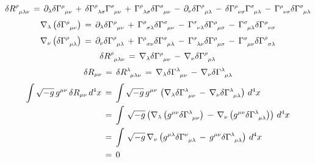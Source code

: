 \begin{equation}
    \delta\R[\rho]{\mu}[\lambda]{\nu} \,=\, \partial\subscr{\lambda}\delta\Gamma\superscr{\rho}\subscr{\;\;\mu\nu} \,+\, \delta\Gamma\superscr{\rho}\subscr{\;\;\lambda\sigma}\Gamma\superscr{\sigma}\subscr{\;\;\mu\nu} \,+\, \Gamma\superscr{\rho}\subscr{\;\;\lambda\sigma}\delta\Gamma\superscr{\sigma}\subscr{\;\;\mu\nu} \,-\, \partial\subscr{\nu}\delta\Gamma\superscr{\rho}\subscr{\;\;\mu\lambda} \,-\, \delta\Gamma\superscr{\rho}\subscr{\;\;\nu\sigma}\Gamma\superscr{\sigma}\subscr{\;\;\mu\lambda} \,-\, \Gamma\superscr{\rho}\subscr{\;\;\nu\sigma}\delta\Gamma\superscr{\sigma}\subscr{\;\;\mu\lambda}
\end{equation}
\begin{equation}
    \nabla\subscr{\lambda}\left(\delta\con{\rho}{\mu}{\nu}\right) \,=\, \partial\subscr{\lambda}\delta\Gamma\superscr{\rho}\subscr{\;\;\mu\nu} \,+\, \Gamma\superscr{\rho}\subscr{\;\;\sigma\lambda}\delta\Gamma\superscr{\sigma}\subscr{\;\;\mu\nu} \,-\, \Gamma\superscr{\sigma}\subscr{\;\;\nu\lambda}\delta\Gamma\superscr{\rho}\subscr{\;\;\mu\sigma} \,-\, \con{\sigma}{\mu}{\lambda}\delta\con{\rho}{\nu}{\sigma}
\end{equation}
\begin{equation}
    \nabla\subscr{\nu}\left(\delta\con{\rho}{\mu}{\lambda}\right) \,=\, \partial\subscr{\nu}\delta\con{\rho}{\mu}{\lambda} \,+\, \con{\rho}{\sigma}{\nu}\delta\con{\sigma}{\mu}{\lambda} \,-\, \con{\sigma}{\lambda}{\nu}\delta\con{\rho}{\mu}{\sigma} \,-\, \con{\sigma}{\mu}{\nu}\delta\con{\rho}{\sigma}{\lambda}
\end{equation}
\begin{equation}
    \delta\R[\rho]{\mu}[\lambda]{\nu} \,=\, \nabla\subscr{\lambda}\delta\con{\rho}{\mu}{\nu} \,-\, \nabla\subscr{\nu}\delta\con{\rho}{\mu}{\lambda}
\end{equation}
\begin{equation}
    \delta\R{\mu}{\nu} \,=\, \delta\R[\lambda]{\mu}[\lambda]{\nu} \,=\, \nabla\subscr{\lambda}\delta\con{\lambda}{\mu}{\nu} \,-\, \nabla\subscr{\nu}\delta\con{\lambda}{\mu}{\lambda}
\end{equation}
\begin{equation}
\begin{split}
    \int \sqrt{-g} \,\g[i]{\mu}{\nu}\,\delta\R{\mu}{\nu}\,d\superscr{4}x \,&=\, \int \sqrt{-g} \,\g[i]{\mu}{\nu} \,\left( \nabla\subscr{\lambda}\delta\con{\lambda}{\mu}{\nu} \,-\, \nabla\subscr{\nu}\delta\con{\lambda}{\mu}{\lambda} \right)\,d\superscr{4}x\\
    &=\, \int\,\sqrt{-g}\left( \nabla\subscr{\lambda}\left(\g[i]{\mu}{\nu}\delta\con{\lambda}{\mu}{\nu}\right) \,-\, \nabla\subscr{\nu}\left(\g[i]{\mu}{\nu}\delta\con{\lambda}{\mu}{\lambda}\right) \right)\,d\superscr{4}x\\
    &=\, \int\,\sqrt{-g}\,\nabla\subscr{\nu}\left(\g[i]{\mu}{\lambda}\delta\con{\nu}{\mu}{\lambda} \,-\,\g[i]{\mu}{\nu}\delta\con{\lambda}{\mu}{\lambda} \right)\,d\superscr{4}x\\
    &=\, 0
    \end{split}
\end{equation}

